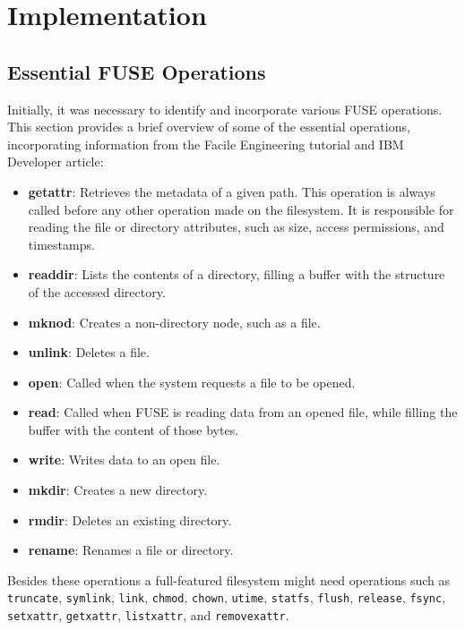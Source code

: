 \chapter{Implementation}
\label{chap:implementation}

\section{Essential FUSE Operations}\label{sec:fuse-ops}

Initially, it was necessary to identify and incorporate various FUSE operations.
This section provides a brief overview of some of the essential operations, incorporating information from the Facile Engineering tutorial and IBM Developer article\cite{ibm_fuse, facile_fuse}:

\begin{itemize}
    \item \textbf{getattr}: Retrieves the metadata of a given path.
    This operation is always called before any other operation made on the filesystem.
    It is responsible for reading the file or directory attributes, such as size, access permissions, and timestamps.
    \item \textbf{readdir}: Lists the contents of a directory, filling a buffer with the structure of the accessed directory.
    \item \textbf{mknod}: Creates a non-directory node, such as a file.
    \item \textbf{unlink}: Deletes a file.
    \item \textbf{open}: Called when the system requests a file to be opened.
    \item \textbf{read}: Called when FUSE is reading data from an opened file, while filling the buffer with the content of those bytes.
    \item \textbf{write}: Writes data to an open file.
    \item \textbf{mkdir}: Creates a new directory.
    \item \textbf{rmdir}: Deletes an existing directory.
    \item \textbf{rename}: Renames a file or directory.
\end{itemize}

Besides these operations a full-featured filesystem might need operations such as \texttt{truncate}, \texttt{symlink}, \texttt{link}, \texttt{chmod}, \texttt{chown}, \texttt{utime}, \texttt{statfs}, \texttt{flush}, \texttt{release}, \texttt{fsync}, \texttt{setxattr}, \texttt{getxattr}, \texttt{listxattr}, and \texttt{removexattr}.

